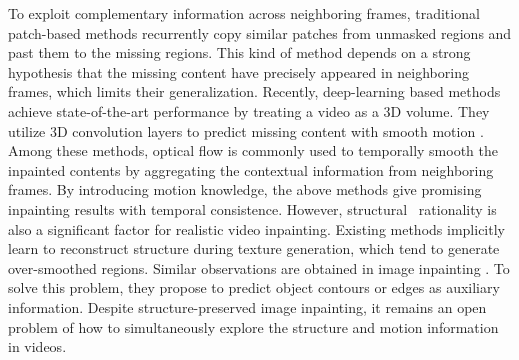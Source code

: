 To exploit complementary information across neighboring frames, traditional patch-based methods \cite{patwardhan2007video,wexler2004space,newson2014video} recurrently copy similar patches from unmasked regions and past them to the missing regions. 
This kind of method depends on a strong hypothesis that the missing content have precisely appeared in neighboring frames, which limits their generalization.
Recently, deep-learning based methods achieve state-of-the-art performance by treating a video as a 3D volume.
They utilize 3D convolution layers to predict missing content with smooth motion \cite{wang2019video}.
Among these methods, optical flow is commonly used to temporally smooth the inpainted contents \cite{Xu_2019_CVPR,Kim_2019_CVPR,Kim_2019_CVPR1} by aggregating the contextual information from neighboring frames.
By introducing motion knowledge, the above methods give promising inpainting results with temporal consistence.
However, structural  rationality is also a significant factor for realistic video inpainting. Existing methods implicitly learn to reconstruct structure during texture generation, which tend to generate over-smoothed regions. 
Similar observations are obtained in image inpainting \cite{Xiong_2019_CVPR,nazeri2019edgeconnect}. %
To solve this problem, they propose to predict object contours or edges as auxiliary information.
Despite structure-preserved image inpainting, it remains an open problem of how to simultaneously explore the structure and motion information in videos.









